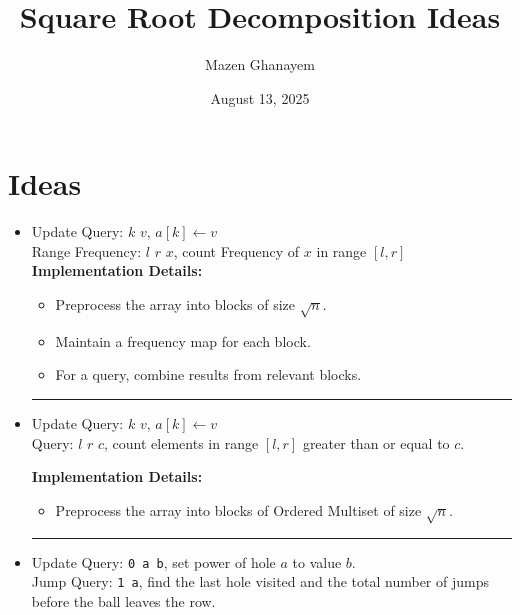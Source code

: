 \documentclass[12pt]{article}
\title{Square Root Decomposition Ideas}
\author{Mazen Ghanayem}
\date{August 13, 2025}
\begin{document}
\maketitle

\section{Ideas}
\begin{itemize}
\item {
    Update Query: $k$ $v$, $a[k] \leftarrow v$ \\
    Range Frequency: $l$ $r$ $x$, count Frequency of $x$ in range $[l, r]$ \\
    
    \textbf{Implementation Details:}
    \begin{itemize}
    \item Preprocess the array into blocks of size $\sqrt{n}$.
    \item Maintain a frequency map for each block.
    \item For a query, combine results from relevant blocks.
    \end{itemize}
}
\rule{\linewidth}{1pt}
\item {
    Update Query: $k$ $v$, $a[k] \leftarrow v$ \\
    Query: $l$ $r$ $c$, count elements in range $[l, r]$ greater than or equal to $c$.

    \textbf{Implementation Details:}
    \begin{itemize}
    \item Preprocess the array into blocks of Ordered Multiset of size $\sqrt{n}$.
    \end{itemize}
}
\rule{\linewidth}{1pt}
\item {
    Update Query: \texttt{0 a b}, set power of hole $a$ to value $b$. \\
    Jump Query: \texttt{1 a}, find the last hole visited and the total number of jumps before the ball leaves the row.

}
\end{itemize}
\end{document}

